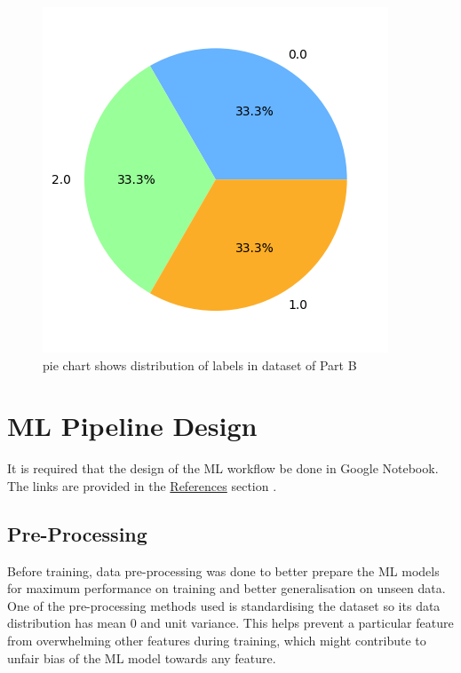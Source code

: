 \documentclass[12pt]{article}
\begin{document}
\begin{figure}[h]
\begin{minipage}{.4\linewidth}
                \includegraphics[width = \linewidth]{figures/multi-marker}
                \caption{pie chart shows distribution of labels in dataset of Part B}
                \label{fig:data-dist-part-b}
            \end{minipage}

        \end{figure}

    \section{ML Pipeline Design}

    It is required that the design of the ML workflow be done in Google Notebook. The links are provided in the
    \hyperref[sec:references]{References} section \cite{binary_dataset, multi_dataset}. 

        \subsection{Pre-Processing}

            Before training, data pre-processing was done to better prepare the ML models for maximum performance on
            training and better generalisation on unseen data. One of the pre-processing methods used is standardising
            the dataset so its data distribution has mean 0 and unit variance. This helps prevent a particular feature
            from overwhelming other features during training, which might contribute to unfair bias of the ML model
            towards any feature.
\end{document}
